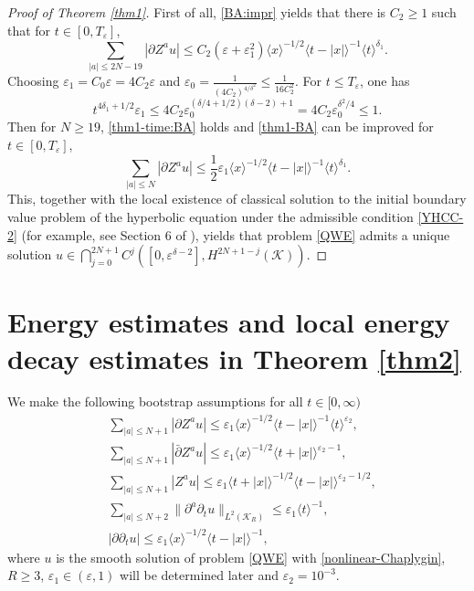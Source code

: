 \documentclass[11pt,twoside]{article}
\def\cK{\mathcal K}
\def\p{\partial}
\def\ve{\varepsilon}
\newcommand{\w}[1]{\langle {#1} \rangle}
\theoremstyle{plain}
\theoremstyle{definition}
\numberwithin{equation}{section}
\begin{document}
\begin{proof}[Proof of Theorem \ref{thm1}]
First of all, \eqref{BA:impr} yields that there is $C_2\ge1$ such that  for $t\in[0,T_\ve]$,
\begin{equation*}
\sum_{|a|\le2N-19}|\p Z^au|\le C_2(\ve+\ve_1^2)\w{x}^{-1/2}\w{t-|x|}^{-1}\w{t}^{\delta_1}.
\end{equation*}
Choosing $\ve_1=C_0\ve=4C_2\ve$ and $\ve_0=\frac{1}{(4C_2)^{4/\delta^2}}\le\frac{1}{16C_2^2}$.
For $t\le T_\ve$, one has
\begin{equation*}
t^{4\delta_1+1/2}\ve_1\le4C_2\ve_0^{(\delta/4+1/2)(\delta-2)+1}=4C_2\ve_0^{\delta^2/4}\le1.
\end{equation*}
Then for $N\ge19$, \eqref{thm1-time:BA} holds and \eqref{thm1-BA} can be improved for $t\in[0,T_\ve]$,
\begin{equation*}
\sum_{|a|\le N}|\p Z^au|\le\frac12\ve_1\w{x}^{-1/2}\w{t-|x|}^{-1}\w{t}^{\delta_1}.
\end{equation*}
This, together with the local existence of classical solution to the initial boundary value problem
of the hyperbolic equation under the admissible condition \eqref{YHCC-2} (for example, see
Section 6 of \cite{Li-Yin18}), yields that problem \eqref{QWE} admits a unique solution
$u\in\bigcap\limits_{j=0}^{2N+1}C^{j}([0,\ve^{\delta-2}], H^{2N+1-j}(\cK))$.
\end{proof}


\section{Energy estimates and local energy decay estimates in Theorem \ref{thm2}}\label{sect5}


We make the following bootstrap assumptions for all $t\in [0, \infty)$
\begin{align}
&\sum_{|a|\le N+1}|\p Z^au|\le\ve_1\w{x}^{-1/2}\w{t-|x|}^{-1}\w{t}^{\ve_2},\label{BA1}\\
&\sum_{|a|\le N+1}|\bar\p Z^au|\le\ve_1\w{x}^{-1/2}\w{t+|x|}^{\ve_2-1},\label{BA2}\\
&\sum_{|a|\le N+1}|Z^au|\le\ve_1\w{t+|x|}^{-1/2}\w{t-|x|}^{\ve_2-1/2},\label{BA3}\\
&\sum_{|a|\le N+2}\|\p^a\p_tu\|_{L^2(\cK_R)}\le\ve_1\w{t}^{-1},\label{BA4}\\
&|\p\p_tu|\le\ve_1\w{x}^{-1/2}\w{t-|x|}^{-1},\label{BA5}
\end{align}
where $u$ is the smooth solution of problem \eqref{QWE} with \eqref{nonlinear-Chaplygin},
$R\ge3$, $\ve_1\in(\ve,1)$ will be determined later and $\ve_2=10^{-3}$.
\end{document}
